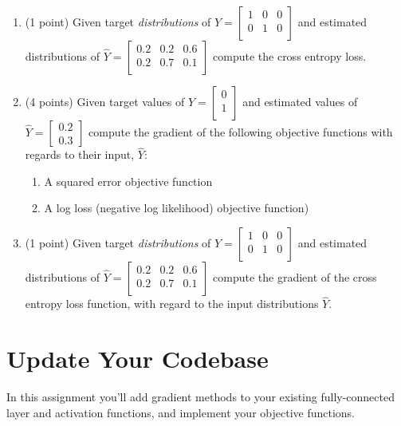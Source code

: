 \documentclass[12pt]{article}
\begin{document}
\begin{enumerate}
\item (1 point) Given target \emph{distributions} of $Y=\begin{bmatrix}
1 & 0 & 0\\
0 & 1 & 0\\
\end{bmatrix}$ and estimated distributions of $\hat{Y}=\begin{bmatrix}
0.2 & 0.2 & 0.6\\
0.2 & 0.7 & 0.1\\
\end{bmatrix}$ compute the cross entropy loss.

\item (4 points) Given target values of $Y=\begin{bmatrix}
0\\
1\\
\end{bmatrix}$ and estimated values of $\hat{Y}=\begin{bmatrix}0.2\\0.3\end{bmatrix}$ compute the gradient of the following objective functions with regards to their input, $\hat{Y}$:
\begin{enumerate}
\item A squared error objective function
\item A log loss (negative log likelihood) objective function)
\end{enumerate}

\item (1 point) Given target \emph{distributions} of $Y=\begin{bmatrix}
1 & 0 & 0\\
0 & 1 & 0\\
\end{bmatrix}$ and estimated distributions of $\hat{Y}=\begin{bmatrix}
0.2 & 0.2 & 0.6\\
0.2 & 0.7 & 0.1\\
\end{bmatrix}$ compute the gradient of the cross entropy loss function, with regard to the input distributions $\hat{Y}$.

\end{enumerate}

\newpage
\section{Update Your Codebase}
In this assignment you'll add gradient methods to your existing fully-connected layer and activation functions, and implement your objective functions.
\end{document}
